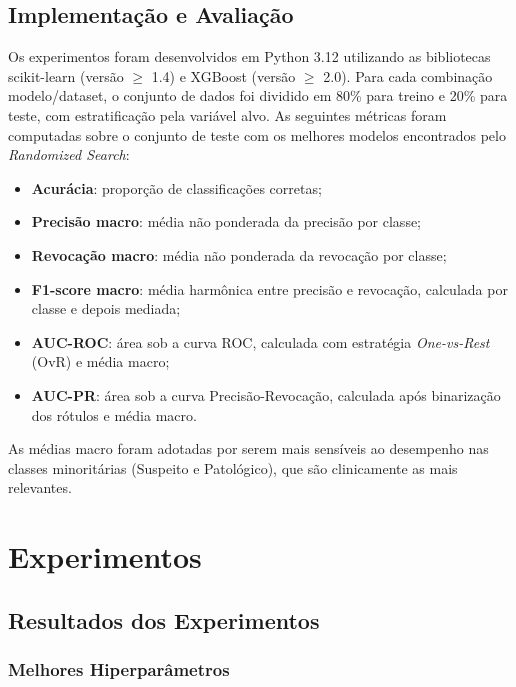 \documentclass[12pt, a4paper]{article}
\begin{document}
\subsection{Implementação e Avaliação}

Os experimentos foram desenvolvidos em Python 3.12 utilizando as bibliotecas scikit-learn
(versão $\geq$ 1.4) e XGBoost (versão $\geq$ 2.0). Para cada combinação modelo/dataset, o
conjunto de dados foi dividido em 80\% para treino e 20\% para teste, com estratificação pela
variável alvo. As seguintes métricas foram computadas sobre o conjunto de teste com os melhores
modelos encontrados pelo \textit{Randomized Search}:

\begin{itemize}
    \item \textbf{Acurácia}: proporção de classificações corretas;
    \item \textbf{Precisão macro}: média não ponderada da precisão por classe;
    \item \textbf{Revocação macro}: média não ponderada da revocação por classe;
    \item \textbf{F1-score macro}: média harmônica entre precisão e revocação, calculada por classe e depois mediada;
    \item \textbf{AUC-ROC}: área sob a curva ROC, calculada com estratégia \textit{One-vs-Rest} (OvR) e média macro;
    \item \textbf{AUC-PR}: área sob a curva Precisão-Revocação, calculada após binarização dos rótulos e média macro.
\end{itemize}

As médias macro foram adotadas por serem mais sensíveis ao desempenho nas classes minoritárias
(Suspeito e Patológico), que são clinicamente as mais relevantes.

\section{Experimentos}
\label{sec:experiments}

\subsection{Resultados dos Experimentos}

\subsubsection{Melhores Hiperparâmetros}
\end{document}

